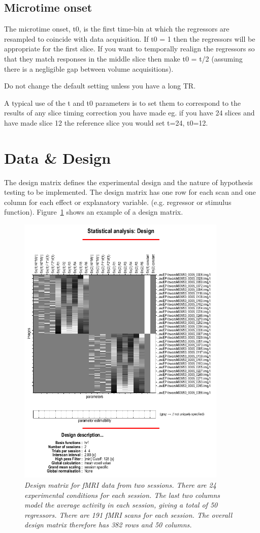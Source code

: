 \documentclass[a4paper,titlepage]{book}
\begin{document}
\subsection{Microtime onset}
The microtime onset, t0, is the first time-bin at which the regressors are resampled to coincide with data acquisition.  If t0 = 1 then the regressors will be appropriate for the first slice.  If you want to temporally realign the regressors so that they match responses in the middle slice then make t0 = t/2 (assuming there is a negligible gap between volume acquisitions).                                           

Do not change the default setting unless you have a long TR. 

A typical use of the t and t0 parameters is to set them 
to correspond to the results of any slice timing correction you have made eg. if you have 24 slices and have made slice 12 the reference slice you would set 
t=24, t0=12. 

\section{Data \& Design}
The design matrix defines the experimental design and the nature of hypothesis testing to be implemented.  The design matrix has one row for each scan and one column for each effect or explanatory variable. (e.g. regressor or stimulus function).  Figure~\ref{design} shows an example
of a design matrix.

\begin{figure}
\includegraphics[width=100mm]{design}
\caption{\em Design matrix for fMRI data from two sessions. 
There are 24 experimental conditions for each session. The last two columns 
model the average activity in each session, giving a total of 50 regressors.
There are 191 fMRI scans for each session. The overall design matrix 
therefore has 382 rows and 50 columns. \label{design}}
\end{figure}
\end{document}
